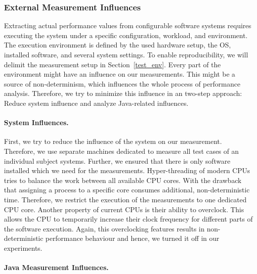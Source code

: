 \subsubsection{External Measurement Influences}

Extracting actual performance values from configurable software systems requires executing the system under a specific configuration, workload, and environment. The execution environment is defined by the used hardware setup, the \ac{OS}, installed software, and several system settings. To enable reproducibility, we will delimit the measurement setup in Section~\ref{test_env}. Every part of the environment might have an influence on our measurements. This might be a source of non-determinism, which influences the whole process of performance analysis. Therefore, we try to minimize this influence in an two-step approach: Reduce system influence and analyze Java-related influences.

\paragraph{System Influences.}
\label{perf_measure_system}

First, we try to reduce the influence of the system on our measurement. Therefore, we use separate machines dedicated to measure all test cases of an individual subject systems. Further, we ensured that there is only software installed which we need for the measurements. Hyper-threading of modern CPUs tries to balance the work between all available CPU cores. With the drawback that assigning a process to a specific core consumes additional, non-deterministic time. Therefore, we restrict the execution of the measurements to one dedicated CPU core. Another property of current CPUs is their ability to overclock. This allows the CPU to temporarily increase their clock frequency for different parts of the software execution. Again, this overclocking features results in non-deterministic performance behaviour and hence, we turned it off in our experiments.


\paragraph{Java Measurement Influences.}
\label{perf_measure_java}

